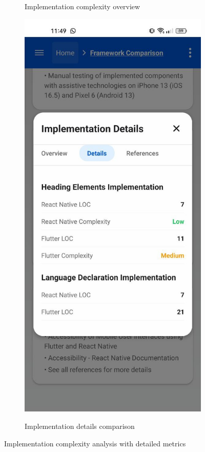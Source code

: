 {\begin{figure}[ht]
\begin{subfigure}[b]{0.48\textwidth}
        \caption{Implementation complexity overview}
        \label{fig:implementation-complexity-card}
    \end{subfigure}
    \hfill
    \begin{subfigure}[b]{0.48\textwidth}
        \centering
        \includegraphics[width=\linewidth, alt={Implementation Details modal showing comparison metrics}]{img/methodology-details.jpg}
        \caption{Implementation details comparison}
        \label{fig:implementation-details-modal}
    \end{subfigure}
    \caption{Implementation complexity analysis with detailed metrics}
    \label{fig:implementation_complexity}
\end{figure}

}
